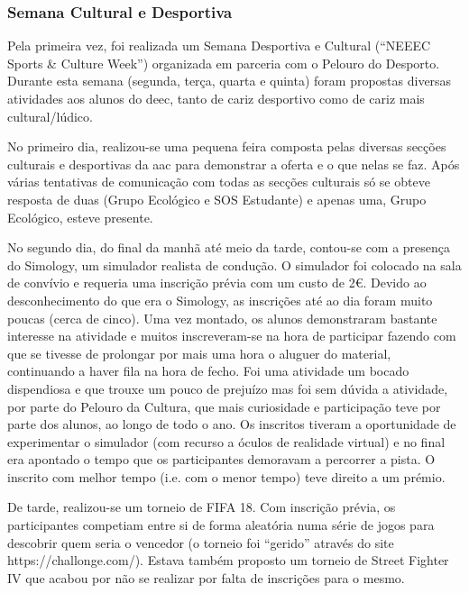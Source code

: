 
\subsubsection{Semana Cultural e Desportiva}

Pela primeira vez, foi realizada um Semana Desportiva e Cultural (“NEEEC Sports \& Culture Week”) organizada em parceria com o Pelouro do Desporto. Durante esta semana (segunda, terça, quarta e quinta) foram propostas diversas atividades aos alunos do \acrshort{deec}, tanto de cariz desportivo como de cariz mais cultural/lúdico.

No primeiro dia, realizou-se uma pequena feira composta pelas diversas secções culturais e desportivas da \acrshort{aac} para demonstrar a oferta e o que nelas se faz. Após várias tentativas de comunicação com todas as secções culturais só se obteve resposta de duas (Grupo Ecológico e SOS Estudante) e apenas uma, Grupo Ecológico, esteve presente.

No segundo dia, do final da manhã até meio da tarde, contou-se com a presença do Simology, um simulador realista de condução. O simulador foi colocado na sala de convívio e requeria uma inscrição prévia com um custo de 2€. Devido ao desconhecimento do que era o Simology, as inscrições até ao dia foram muito poucas (cerca de cinco). Uma vez montado, os alunos demonstraram bastante interesse na atividade e muitos inscreveram-se na hora de participar fazendo com que se tivesse de prolongar por mais uma hora o aluguer do material, continuando a haver fila na hora de fecho. Foi uma atividade um bocado dispendiosa e que trouxe um pouco de prejuízo mas foi sem dúvida a atividade, por parte do Pelouro da Cultura, que mais curiosidade e participação teve por parte dos alunos, ao longo de todo o ano. Os inscritos tiveram a oportunidade de experimentar o simulador (com recurso a óculos de realidade virtual) e no final era apontado o tempo que os participantes demoravam a percorrer a pista. O inscrito com melhor tempo (i.e. com o menor tempo) teve direito a um prémio.

De tarde, realizou-se um torneio de FIFA 18. Com inscrição prévia, os participantes competiam entre si de forma aleatória numa série de jogos para descobrir quem seria o vencedor (o torneio foi “gerido” através do site https://challonge.com/). Estava também proposto um torneio de Street Fighter IV que acabou por não se realizar por falta de inscrições para o mesmo.

